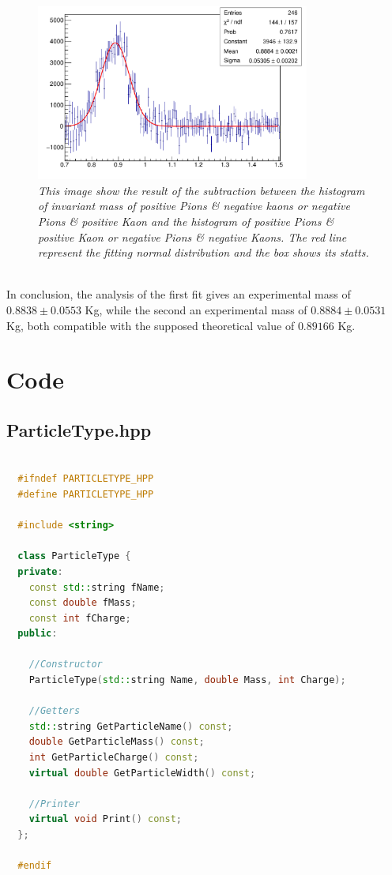 \documentclass[a4paper, 11pt]{article}
\begin{document}
    \begin{figure}[h!]
      \includegraphics[width=9cm]{c5.pdf}
      \caption{\label{f6} \textit{This image show the result of the subtraction between the histogram of invariant mass of positive Pions \& negative kaons or negative Pions \& positive Kaon and the histogram of positive Pions \& positive Kaon or negative Pions \& negative Kaons. The red line represent the fitting normal distribution and the box shows its statts.}}
    \end{figure}
    \\
    In conclusion, the analysis of the first fit gives an experimental mass of $0.8838 \pm 0.0553$ Kg, while the second an experimental mass of $0.8884 \pm 0.0531$ Kg, both compatible with the supposed theoretical value of $0.89166$ Kg.

    \section{Code}
      \subsection{ParticleType.hpp}

        \begin{lstlisting}[language=c++, style=code]

  #ifndef PARTICLETYPE_HPP
  #define PARTICLETYPE_HPP

  #include <string>

  class ParticleType {
  private:
    const std::string fName;
    const double fMass;
    const int fCharge;
  public:

    //Constructor
    ParticleType(std::string Name, double Mass, int Charge);

    //Getters
    std::string GetParticleName() const;
    double GetParticleMass() const;
    int GetParticleCharge() const;
    virtual double GetParticleWidth() const;

    //Printer
    virtual void Print() const;
  };

  #endif
        \end{lstlisting}
\end{document}
